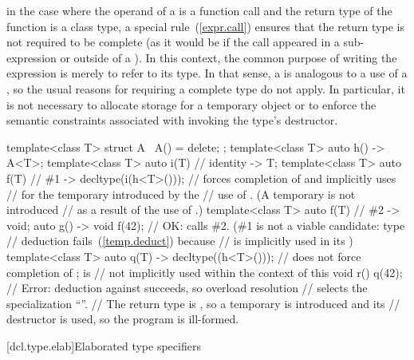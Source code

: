 \pnum
\enternote in the case where the operand of a 
is a function call and the return type of the function is a class type, a
special rule~(\ref{expr.call}) ensures that the return type is not required to
be complete (as it would be if the call appeared in a sub-expression or outside
of a ). In this context, the common purpose of
writing the expression is merely to refer to its type. In that sense, a
 is analogous to a use of a ,
so the usual reasons for requiring a complete type do not apply. In particular,
it is not necessary to allocate storage for a temporary object or to enforce the
semantic constraints associated with invoking the type's destructor. \enterexample
\begin{codeblock}
template<class T> struct A { ~A() = delete; };
template<class T> auto h()
  -> A<T>;
template<class T> auto i(T)     // identity
  -> T;
template<class T> auto f(T)     // \#1
  -> decltype(i(h<T>()));       // forces completion of  and implicitly uses
                                //  for the temporary introduced by the
                                // use of . (A temporary is not introduced
                                // as a result of the use of .)
template<class T> auto f(T)     // \#2
  -> void;
auto g() -> void {
  f(42);                        // OK: calls \#2. (\#1 is not a viable candidate: type
                                // deduction fails~(\ref{temp.deduct}) because 
                                // is implicitly used in its )
}
template<class T> auto q(T)
  -> decltype((h<T>()));        // does not force completion of ;  is
                                // not implicitly used within the context of this 
void r() {
  q(42);                        // Error: deduction against  succeeds, so overload resolution
                                // selects the specialization ``''.
                                // The return type is , so a temporary is introduced and its
                                // destructor is used, so the program is ill-formed.
}
\end{codeblock}
\exitexample\exitnote

[dcl.type.elab]{Elaborated type specifiers}%
%
%


